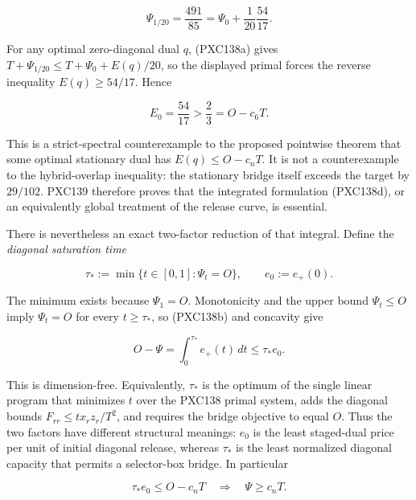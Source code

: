 \documentclass[11pt]{article}
\begin{document}
\[
 \Psi_{1/20}=\frac{491}{85}
 =\Psi_0+\frac1{20}\frac{54}{17}.
\]

For any optimal zero-diagonal dual \(q\), (PXC138a) gives
\(T+\Psi_{1/20}\le T+\Psi_0+E(q)/20\), so the displayed primal forces the
reverse inequality \(E(q)\ge54/17\).  Hence

\begin{equation}
 E_0=\frac{54}{17}>\frac23=O-c_6T.                      \tag{PXC139d}
\end{equation}

This is a strict-spectral counterexample to the proposed pointwise theorem
that some optimal stationary dual has \(E(q)\le O-c_nT\).  It is not a
counterexample to the hybrid-overlap inequality: the stationary bridge
itself exceeds the target by \(29/102\).  PXC139 therefore proves that the
integrated formulation (PXC138d), or an equivalently global treatment of
the release curve, is essential.

There is nevertheless an exact two-factor reduction of that integral.
Define the \emph{diagonal saturation time}

\begin{equation}
 \tau_*:=\min\{t\in[0,1]:\Psi_t=O\},
 \qquad e_0:=e_+(0).                                  \tag{PXC140a}
\end{equation}

The minimum exists because \(\Psi_1=O\).  Monotonicity and the upper bound
\(\Psi_t\le O\) imply \(\Psi_t=O\) for every \(t\ge\tau_*\), so (PXC138b)
and concavity give

\begin{equation}
 O-\Psi=\int_0^{\tau_*}e_+(t)\,dt
       \le \tau_*e_0.                                  \tag{PXC140b}
\end{equation}

This is dimension-free.  Equivalently, \(\tau_*\) is the optimum of the
single linear program that minimizes \(t\) over the PXC138 primal system,
adds the diagonal bounds \(F_{rr}\le t x_rz_r/T^2\), and requires the bridge
objective to equal \(O\).  Thus the two factors have different structural
meanings: \(e_0\) is the least staged-dual price per unit of initial diagonal
release, whereas \(\tau_*\) is the least normalized diagonal capacity that
permits a selector-box bridge.  In particular

\begin{equation}
 \boxed{\quad
 \tau_*e_0\le O-c_nT\quad\Longrightarrow\quad
 \Psi\ge c_nT .\quad}                                  \tag{PXC140c}
\end{equation}
\end{document}
